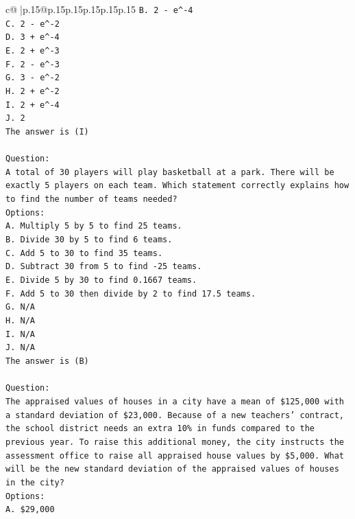 \documentclass{article}
\begin{document}
{\begin{supertabular}{c@{$\;$}|p{.15\linewidth}@{}p{.15\linewidth}p{.15\linewidth}p{.15\linewidth}p{.15\linewidth}p{.15\linewidth}}
{{{\texttt{B. 2 {-} e\^{}{-}4} \\
\texttt{C. 2 {-} e\^{}{-}2} \\
\texttt{D. 3 + e\^{}{-}4} \\
\texttt{E. 2 + e\^{}{-}3} \\
\texttt{F. 2 {-} e\^{}{-}3} \\
\texttt{G. 3 {-} e\^{}{-}2} \\
\texttt{H. 2 + e\^{}{-}2} \\
\texttt{I. 2 + e\^{}{-}4} \\
\texttt{J. 2} \\
\texttt{The answer is (I)} \\
\\ 
\texttt{Question:} \\
\texttt{A total of 30 players will play basketball at a park. There will be exactly 5 players on each team. Which statement correctly explains how to find the number of teams needed?} \\
\texttt{Options:} \\
\texttt{A. Multiply 5 by 5 to find 25 teams.} \\
\texttt{B. Divide 30 by 5 to find 6 teams.} \\
\texttt{C. Add 5 to 30 to find 35 teams.} \\
\texttt{D. Subtract 30 from 5 to find {-}25 teams.} \\
\texttt{E. Divide 5 by 30 to find 0.1667 teams.} \\
\texttt{F. Add 5 to 30 then divide by 2 to find 17.5 teams.} \\
\texttt{G. N/A} \\
\texttt{H. N/A} \\
\texttt{I. N/A} \\
\texttt{J. N/A} \\
\texttt{The answer is (B)} \\
\\ 
\texttt{Question:} \\
\texttt{The appraised values of houses in a city have a mean of \$125,000 with a standard deviation of \$23,000. Because of a new teachers' contract, the school district needs an extra 10\% in funds compared to the previous year. To raise this additional money, the city instructs the assessment office to raise all appraised house values by \$5,000. What will be the new standard deviation of the appraised values of houses in the city?} \\
\texttt{Options:} \\
\texttt{A. \$29,000} \\
}}}
\end{supertabular}}
\end{document}
